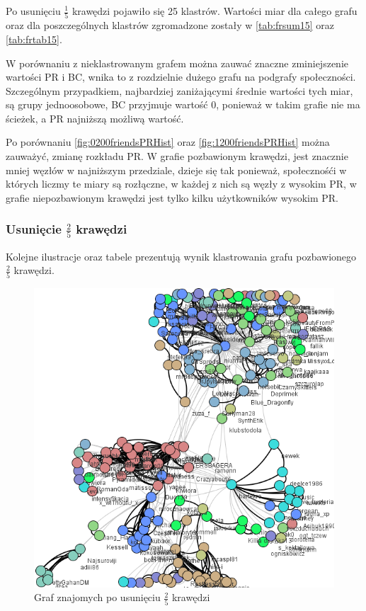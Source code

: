 \documentclass[10pt,a4paper]{article}
\begin{document}
Po usunięciu $\frac{1}{5}$ krawędzi pojawiło się 25 klastrów. Wartości miar dla całego grafu oraz dla poszczególnych klastrów zgromadzone zostały w  \ref{tab:frsum15} oraz \ref{tab:frtab15}. 

W porównaniu z nieklastrowanym grafem można zauwać znaczne zminiejszenie wartości PR i BC, wnika to z rozdzielnie dużego grafu na podgrafy społeczności. Szczególnym przypadkiem, najbardziej zaniżającymi średnie wartości tych miar, są grupy jednoosobowe, BC przyjmuje wartość 0, ponieważ w takim grafie nie ma ścieżek, a PR najniższą możliwą wartość.

Po porównaniu \ref{fig:0200friendsPRHist} oraz \ref{fig:1200friendsPRHist} można zauważyć, zmianę rozkładu PR. W grafie pozbawionym krawędzi, jest znacznie mniej węzłów w najniższym przedziale, dzieje się tak ponieważ, społecznośći w których liczmy te miary są rozłączne, w każdej z nich są węzły z wysokim PR, w grafie niepozbawionym krawędzi jest tylko kilku użytkowników wysokim PR.


\subsubsection {Usunięcie $\frac{2}{5}$ krawędzi}
Kolejne ilustracje oraz tabele prezentują wynik klastrowania grafu pozbawionego  $\frac{2}{5}$  krawędzi.
\begin{figure}[H]
\centering
\caption{Graf znajomych po usunięciu $\frac{2}{5}$ krawędzi}
\includegraphics[scale=0.6]{wyniki/final200Friends/2200friends.png}
\end{figure}
\end{document}
